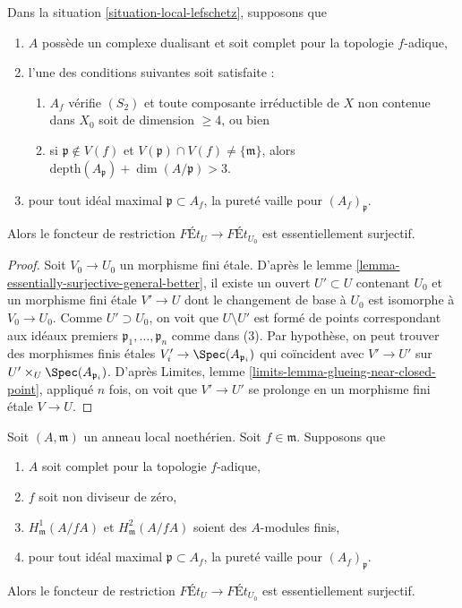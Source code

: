 \begin{lemma}
\label{lemma-equivalence-better}
Dans la situation \ref{situation-local-lefschetz}, supposons que
\begin{enumerate}
\item $A$ possède un complexe dualisant et soit complet pour la topologie $f$-adique,
\item l'une des conditions suivantes soit satisfaite :
\begin{enumerate}
\item $A_f$ vérifie $(S_2)$ et toute composante irréductible de $X$
non contenue dans $X_0$ soit de dimension $\geq 4$, ou bien
\item si $\mathfrak p \not \in V(f)$ et
$V(\mathfrak p) \cap V(f) \not = \{\mathfrak m\}$, alors
$\text{depth}(A_\mathfrak p) + \dim(A/\mathfrak p) > 3$.
\end{enumerate}
\item pour tout idéal maximal $\mathfrak p \subset A_f$,
la pureté vaille pour $(A_f)_\mathfrak p$.
\end{enumerate}
Alors le foncteur de restriction $\textit{F\'Et}_U \to \textit{F\'Et}_{U_0}$
est essentiellement surjectif.
\end{lemma}

\begin{proof}
Soit $V_0 \to U_0$ un morphisme fini étale. D'après le
lemme \ref{lemma-essentially-surjective-general-better},
il existe un ouvert $U' \subset U$ contenant $U_0$ et
un morphisme fini étale $V' \to U$ dont le changement de base à $U_0$
est isomorphe à $V_0 \to U_0$. Comme $U' \supset U_0$,
on voit que $U \setminus U'$ est formé de points correspondant
aux idéaux premiers $\mathfrak p_1, \ldots, \mathfrak p_n$ comme dans (3).
Par hypothèse, on peut trouver des morphismes finis étales
$V'_i \to \Spec(A_{\mathfrak p_i})$ qui coïncident avec
$V' \to U'$ sur $U' \times_U \Spec(A_{\mathfrak p_i})$.
D'après Limites, lemme \ref{limits-lemma-glueing-near-closed-point},
appliqué $n$ fois, on voit que $V' \to U'$ se prolonge en un morphisme fini étale
$V \to U$.
\end{proof}

\begin{lemma}
\label{lemma-equivalence}
Soit $(A, \mathfrak m)$ un anneau local noethérien.
Soit $f \in \mathfrak m$. Supposons que
\begin{enumerate}
\item $A$ soit complet pour la topologie $f$-adique,
\item $f$ soit non diviseur de zéro,
\item $H^1_\mathfrak m(A/fA)$ et $H^2_\mathfrak m(A/fA)$ soient des
$A$-modules finis,
\item pour tout idéal maximal $\mathfrak p \subset A_f$,
la pureté vaille pour $(A_f)_\mathfrak p$.
\end{enumerate}
Alors le foncteur de restriction $\textit{F\'Et}_U \to \textit{F\'Et}_{U_0}$
est essentiellement surjectif.
\end{lemma}

